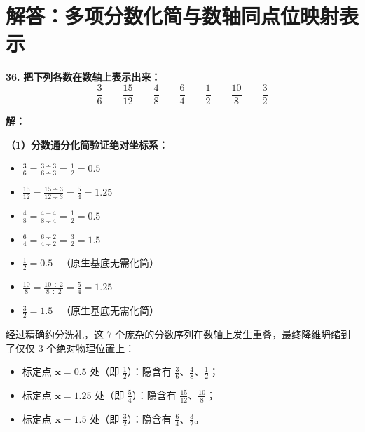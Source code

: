 \documentclass[12pt, a4paper]{ctexrep}
\begin{document}
\newpage

\section{解答：多项分数化简与数轴同点位映射表示}

\vspace{0.6cm}

\textbf{\LARGE 36.} \textbf{把下列各数在数轴上表示出来：}
\[
\frac{3}{6} \qquad \frac{15}{12} \qquad \frac{4}{8} \qquad \frac{6}{4} \qquad \frac{1}{2} \qquad \frac{10}{8} \qquad \frac{3}{2}
\]

\vspace{0.4cm}
\textbf{解：}

\textbf{（1）分数通分化简验证绝对坐标系：}
\begin{itemize}
    \item $\displaystyle \frac{3}{6} = \frac{3 \div 3}{6 \div 3} = \frac{1}{2} = 0.5$
    \item $\displaystyle \frac{15}{12} = \frac{15 \div 3}{12 \div 3} = \frac{5}{4} = 1.25$
    \item $\displaystyle \frac{4}{8} = \frac{4 \div 4}{8 \div 4} = \frac{1}{2} = 0.5$
    \item $\displaystyle \frac{6}{4} = \frac{6 \div 2}{4 \div 2} = \frac{3}{2} = 1.5$
    \item $\displaystyle \frac{1}{2} = 0.5$ \ （原生基底无需化简）
    \item $\displaystyle \frac{10}{8} = \frac{10 \div 2}{8 \div 2} = \frac{5}{4} = 1.25$
    \item $\displaystyle \frac{3}{2} = 1.5$ \ （原生基底无需化简）
\end{itemize}

经过精确约分洗礼，这 $7$ 个庞杂的分数序列在数轴上发生重叠，最终降维坍缩到了仅仅 $3$ 个绝对物理位置上：
\begin{itemize}
    \item 标定点 $\boldsymbol{x=0.5}$ 处（即 $\frac{1}{2}$）：隐含有 $\displaystyle\frac{3}{6} \text{、} \frac{4}{8} \text{、} \frac{1}{2}$；
    \item 标定点 $\boldsymbol{x=1.25}$ 处（即 $\frac{5}{4}$）：隐含有 $\displaystyle\frac{15}{12} \text{、} \frac{10}{8}$；
    \item 标定点 $\boldsymbol{x=1.5}$ 处（即 $\frac{3}{2}$）：隐含有 $\displaystyle\frac{6}{4} \text{、} \frac{3}{2}$。
\end{itemize}
\end{document}
